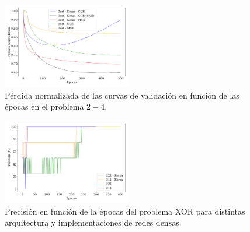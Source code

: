     \begin{figure}[H]
        \begin{small}
            \begin{center}
                \includegraphics[width=0.5\textwidth]{Graphs/ejer2_4_loss.pdf}
            \end{center}
            \caption{Pérdida normalizada de las curvas de validación en función de las épocas en el problema $2-4$.}
            \label{fig:ejer2_4_loss}
        \end{small}
    \end{figure}

    \begin{figure}[H]
        \begin{small}
            \begin{center}
                \includegraphics[width=0.5\textwidth]{Graphs/ejer2_6_acc.pdf}
            \end{center}
            \caption{Precisión en función de la épocas del problema XOR para distintas arquitectura y implementaciones de redes densas.}
            \label{fig:ejer2-6-acc}
        \end{small}
    \end{figure}

